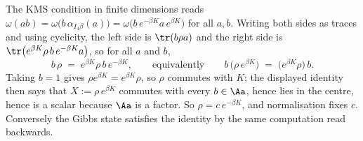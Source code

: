 The KMS condition in finite dimensions reads $\omega(ab) = \omega\bigl(b\,\alpha_{I_4\beta}(a)\bigr) = \omega\bigl(b\,e^{-\beta K} a\, e^{\beta K}\bigr)$ for all $a, b$. Writing both sides as traces and using cyclicity, the left side is $\tr(b\rho a)$ and the right side is $\tr\bigl(e^{\beta K}\rho\, b\, e^{-\beta K} a\bigr)$, so for all $a$ and $b$,
\[
b\,\rho \;=\; e^{\beta K} \rho\, b\, e^{-\beta K},
\qquad\text{equivalently}\qquad
b\,\bigl(\rho\, e^{\beta K}\bigr) \;=\; \bigl(e^{\beta K}\rho\bigr)\, b .
\]
Taking $b = 1$ gives $\rho e^{\beta K} = e^{\beta K}\rho$, so $\rho$ commutes with $K$; the displayed identity then says that $X := \rho\,e^{\beta K}$ commutes with every $b \in \Aa$, hence lies in the centre, hence is a scalar because $\Aa$ is a factor. So $\rho = c\,e^{-\beta K}$, and normalisation fixes $c$. Conversely the Gibbs state satisfies the identity by the same computation read backwards.
